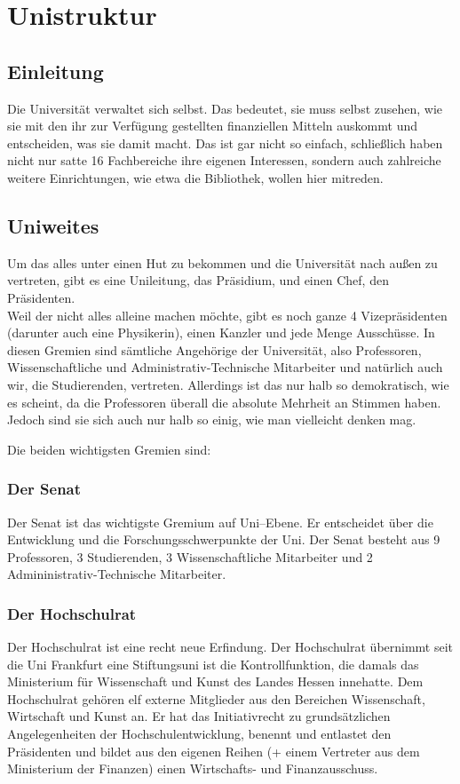 \section{Unistruktur}
%
%
\subsection{Einleitung}
Die Universität verwaltet sich selbst. 
Das bedeutet, sie muss selbst zusehen, wie sie mit den ihr zur Verfügung gestellten finanziellen Mitteln auskommt 
und entscheiden, was sie damit macht. 
Das ist gar nicht so einfach, schließlich haben nicht nur satte 16 Fachbereiche ihre eigenen Interessen, 
sondern auch zahlreiche weitere Einrichtungen, wie etwa die Bibliothek, wollen hier mitreden.

\subsection{Uniweites}
Um das alles unter einen Hut zu bekommen und die Universität nach außen zu vertreten, 
gibt es eine Unileitung, das Präsidium, und einen Chef, den Präsidenten.\\
Weil der nicht alles alleine machen möchte, gibt es noch ganze 4 Vizepräsidenten (darunter auch eine Physikerin), 
einen Kanzler und jede Menge Ausschüsse.
In diesen Gremien sind sämtliche Angehörige der Universität, also Professoren, 
Wissenschaftliche und Administrativ-Technische Mitarbeiter und natürlich auch wir, die Studierenden, vertreten.
Allerdings ist das nur halb so demokratisch, wie es scheint, da die Professoren überall die absolute Mehrheit an Stimmen haben. 
Jedoch sind sie sich auch nur halb so einig, wie man vielleicht denken mag.

Die beiden wichtigsten Gremien sind:

\subsubsection{Der Senat}
Der Senat ist das wichtigste Gremium auf Uni--Ebene.
Er entscheidet über die Entwicklung und die Forschungsschwerpunkte der Uni.
Der Senat besteht aus 9 Professoren, 3 Studierenden, 3 Wissenschaftliche Mitarbeiter und 2 Admininistrativ-Technische Mitarbeiter.

\subsubsection{Der Hochschulrat}
Der Hochschulrat ist eine recht neue Erfindung.
Der Hochschulrat übernimmt seit die Uni Frankfurt eine Stiftungsuni ist die Kontrollfunktion, die damals das Ministerium für Wissenschaft und Kunst des Landes Hessen innehatte.
Dem Hochschulrat gehören elf externe Mitglieder aus den Bereichen Wissenschaft, Wirtschaft und Kunst an.
Er hat das Initiativrecht zu grundsätzlichen Angelegenheiten der Hochschulentwicklung, benennt und entlastet den Präsidenten und bildet aus den eigenen Reihen
(+ einem Vertreter aus dem Ministerium der Finanzen) einen Wirtschafts- und Finanzausschuss.

